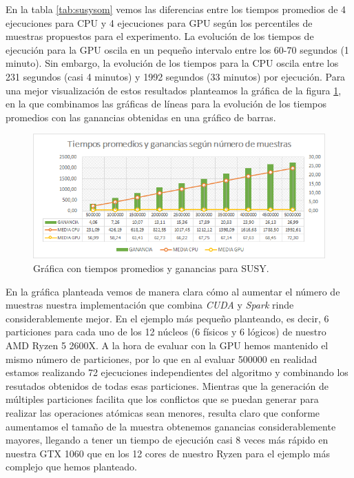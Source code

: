 En la tabla \ref{tab:susysom} vemos las diferencias entre los tiempos promedios de 4 ejecuciones para CPU y 4 ejecuciones para GPU según los percentiles de muestras propuestos para el experimento. La evolución de los tiempos de ejecución para la GPU oscila en un pequeño intervalo entre los 60-70 segundos (1 minuto). Sin embargo, la evolución de los tiempos para la CPU oscila entre los 231 segundos (casi 4 minutos) y 1992 segundos (33 minutos) por ejecución.  Para una mejor visualización de estos resultados planteamos la gráfica de la figura \ref{img:somsusy}, en la que combinamos las gráficas de líneas para la evolución de los tiempos promedios con las ganancias obtenidas en una gráfico de barras. \\

\begin{figure}[ht]
\centering
\includegraphics[scale=0.7]{imagenes/susysom.png}
\caption{Gráfica con tiempos promedios y ganancias para SUSY.}
\label{img:somsusy}
\end{figure}

En la gráfica planteada vemos de manera clara cómo al aumentar el número de muestras nuestra implementación que combina \textit{CUDA} y \textit{Spark} rinde considerablemente mejor. En el ejemplo más pequeño planteando, es decir, 6 particiones para cada uno de los 12 núcleos (6 físicos y 6 lógicos) de nuestro AMD Ryzen 5 2600X. A la hora de evaluar con la GPU hemos mantenido el mismo número de particiones, por lo que en al evaluar 500000 en realidad estamos realizando 72 ejecuciones independientes del algoritmo y combinando los resutados obtenidos de todas esas particiones. Mientras que la generación de múltiples particiones facilita que los conflictos que se puedan generar para realizar las operaciones atómicas sean menores, resulta claro que conforme aumentamos el tamaño de la muestra obtenemos ganancias considerablemente mayores, llegando a tener un tiempo de ejecución casi 8 veces más rápido en nuestra GTX 1060 que en los 12 cores de nuestro Ryzen para el ejemplo más complejo que hemos planteado.



